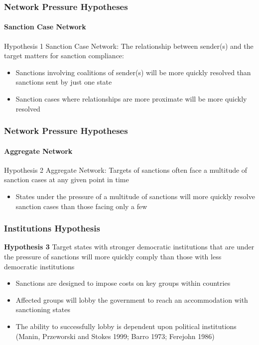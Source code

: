 
\begin{frame}
\frametitle{Network Pressure Hypotheses}
\framesubtitle{Sanction Case Network}

\begin{block}{Hypothesis 1}
	Sanction Case Network: The relationship between sender(s) and the target matters for sanction compliance: 
\end{block}

\begin{itemize}
	\item Sanctions involving coalitions of sender(s) will be more quickly resolved than sanctions sent by just one state
	\item Sanction cases where relationships are more proximate will be more quickly resolved
\end{itemize}

\end{frame}

\begin{frame}
\frametitle{Network Pressure Hypotheses}
\framesubtitle{Aggregate Network}

\begin{block}{Hypothesis 2}
	Aggregate Network: Targets of sanctions often face a multitude of sanction cases at any given point in time
\end{block}

\begin{itemize}
	\item States under the pressure of a multitude of sanctions will more quickly resolve sanction cases than those facing only a few
\end{itemize}

\end{frame}

\begin{frame}
\frametitle{Institutions Hypothesis}

\begin{block}{\textbf{Hypothesis 3}}
	Target states with stronger democratic institutions that are under the pressure of sanctions will more quickly comply than those with less democratic institutions
\end{block}

\begin{itemize}
	\item Sanctions are designed to impose costs on key groups within countries
	\item Affected groups will lobby the government to reach an accommodation with sanctioning states
	\item The ability to successfully lobby is dependent upon political institutions (Manin, Przeworski and Stokes 1999; Barro 1973; Ferejohn 1986)
\end{itemize}

\end{frame}

